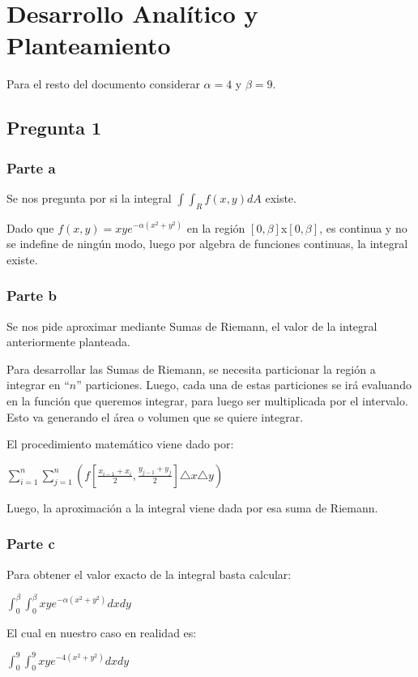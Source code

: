 \documentclass[12pt,letterpaper]{article}
\begin{document}


\section{Desarrollo Analítico y Planteamiento}
Para el resto del documento considerar $\alpha=4$ y $\beta=9$.
\subsection{Pregunta 1}
\subsubsection{Parte a}
Se nos pregunta por si la integral $\int\int_Rf(x,y)dA$ existe.

Dado que $f(x,y)=xye^{-\alpha(x^2+y^2)}$ en la región $[0,\beta]$x$[0,\beta]$, es continua y no se indefine de ningún modo, luego por algebra de funciones continuas, la integral existe.

\subsubsection{Parte b}
Se nos pide aproximar mediante Sumas de Riemann, el valor de la integral anteriormente planteada.

Para desarrollar las Sumas de Riemann, se necesita particionar la región a integrar en ``$n$'' particiones. Luego, cada una de estas particiones se irá evaluando en la función que queremos integrar, para luego ser multiplicada por el intervalo. Esto va generando el área o volumen que se quiere integrar.

El procedimiento matemático viene dado por: 
\begin{center}$\sum _{i=1}^n \sum _{j=1}^n (f\left[\frac{x_{i-1}+x_i}{2},\frac{y_{j-1}+y_j}{2}\right]\triangle x \triangle y)$\end{center}

Luego, la aproximación a la integral viene dada por esa suma de Riemann.

\subsubsection{Parte c}
Para obtener el valor exacto de la integral basta calcular: 
\begin{center}$\int_0^{\beta}\int_0^{\beta} xye^{-\alpha(x^2+y^2)} dxdy$\end{center}

El cual en nuestro caso en realidad es:
\begin{center}$\int_0^{9}\int_0^{9} xye^{-4(x^2+y^2)} dxdy$\end{center}
\end{document}
